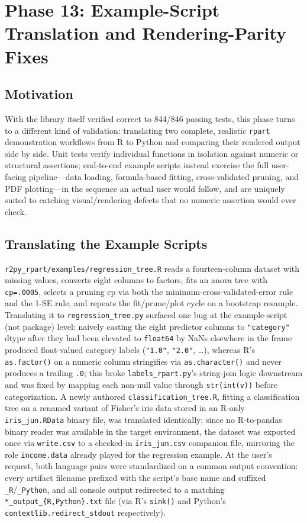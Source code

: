 \documentclass[12pt]{article}
\begin{document}
\section{Phase 13: Example-Script Translation and Rendering-Parity Fixes}
\label{sec:phase13}

\subsection{Motivation}

With the library itself verified correct to 844/846 passing tests, this phase turns to a different kind of validation: translating two complete, realistic \texttt{rpart} demonstration workflows from R to Python and comparing their rendered output side by side. Unit tests verify individual functions in isolation against numeric or structural assertions; end-to-end example scripts instead exercise the full user-facing pipeline---data loading, formula-based fitting, cross-validated pruning, and PDF plotting---in the sequence an actual user would follow, and are uniquely suited to catching visual/rendering defects that no numeric assertion would ever check.

\subsection{Translating the Example Scripts}

\texttt{r2py\_rpart/examples/regression\_tree.R} reads a fourteen-column dataset with missing values, converts eight columns to factors, fits an anova tree with \texttt{cp=.0005}, selects a pruning cp via both the minimum-cross-validated-error rule and the 1-SE rule, and repeats the fit/prune/plot cycle on a bootstrap resample. Translating it to \texttt{regression\_tree.py} surfaced one bug at the example-script (not package) level: naively casting the eight predictor columns to \texttt{"category"} dtype after they had been elevated to \texttt{float64} by NaNs elsewhere in the frame produced float-valued category labels (\texttt{"1.0"}, \texttt{"2.0"}, \ldots), whereas R's \texttt{as.factor()} on a numeric column stringifies via \texttt{as.character()} and never produces a trailing \texttt{.0}; this broke \texttt{labels\_rpart.py}'s string-join logic downstream and was fixed by mapping each non-null value through \texttt{str(int(v))} before categorization. A newly authored \texttt{classification\_tree.R}, fitting a classification tree on a renamed variant of Fisher's iris data stored in an R-only \texttt{iris\_jun.RData} binary file, was translated identically; since no R-to-pandas binary reader was available in the target environment, the dataset was exported once via \texttt{write.csv} to a checked-in \texttt{iris\_jun.csv} companion file, mirroring the role \texttt{income.data} already played for the regression example. At the user's request, both language pairs were standardized on a common output convention: every artifact filename prefixed with the script's base name and suffixed \texttt{\_R}/\texttt{\_Python}, and all console output redirected to a matching \texttt{*\_output\_\{R,Python\}.txt} file (via R's \texttt{sink()} and Python's \texttt{contextlib.redirect\_stdout} respectively).
\end{document}
